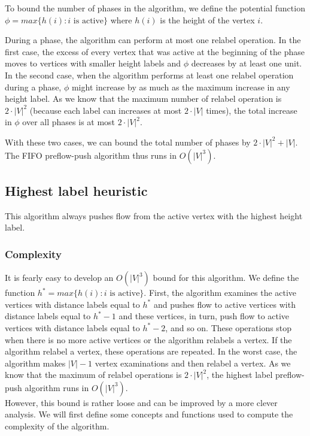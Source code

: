 To bound the number of phases in the algorithm, we define the potential function $\phi = max\{h(i) : i\text{ is active}\}$ where $h(i)$ is the height of the vertex $i$.

During a phase, the algorithm can perform at most one relabel operation. In the first case, the excess of every vertex that was active at the beginning of the phase moves to vertices with smaller height labels and $\phi$ decreases by at least one unit. In the second case, when the algorithm performs at least one relabel operation during a phase, $\phi$ might increase by as much as the maximum increase in any height label. As we know that the maximum number of relabel operation is $2\cdot|V|^2$ (because each label can increases at most $2\cdot|V|$ times), the total increase in $\phi$ over all phases is at most $2\cdot|V|^2$.

With these two cases, we can bound the total number of phases by $2\cdot|V|^2 + |V|$. The FIFO preflow-push algorithm thus runs in $O(|V|^3)$.

\subsection{Highest label heuristic}
\label{sec:hlh}

This algorithm always pushes flow from the active vertex with the highest height label. 

\subsubsection{Complexity}

It is fearly easy to develop an $O(|V|^3)$ bound for this algorithm. We define the function $h^{*} = max\{h(i): i\text{ is active}\}$. First, the algorithm examines the active vertices with distance labels equal to $h^{*}$ and pushes flow to active vertices with distance labels equal to $h^{*}-1$ and these vertices, in turn, push flow to active vertices with distance labels equal to $h^{*}-2$, and so on. These operations stop when there is no more active vertices or the algorithm relabels a vertex. If the algorithm relabel a vertex, these operations are repeated. In the worst case, the algorithm makes $|V| - 1$ vertex examinations and then relabel a vertex. As we know that the maximum of relabel operations is $2\cdot|V|^2$, the highest label preflow-push algorithm runs in $O(|V|^3)$.\\

However, this bound is rather loose and can be improved by a more clever analysis. We will first define some concepts and functions used to compute the complexity of the algorithm.\\

